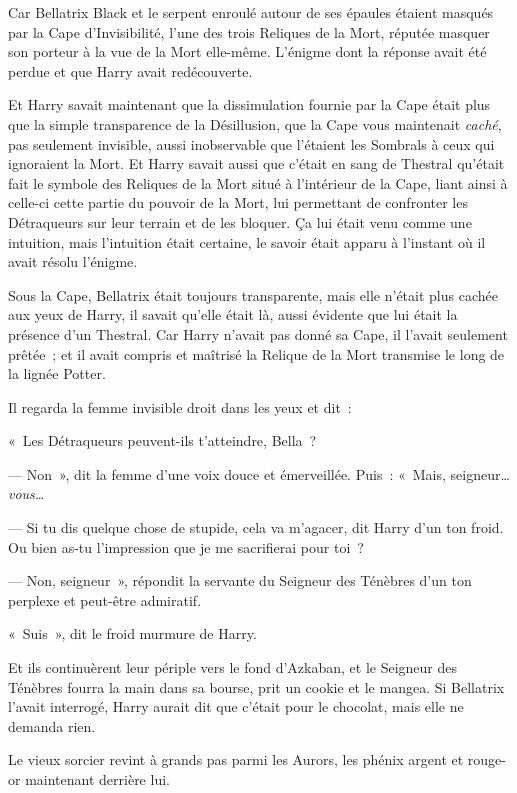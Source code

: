 Car Bellatrix Black et le serpent enroulé autour de ses épaules étaient masqués par la Cape d'Invisibilité, l'une des trois Reliques de la Mort, réputée masquer son porteur à la vue de la Mort elle-même. L'énigme dont la réponse avait été perdue et que Harry avait redécouverte.

Et Harry savait maintenant que la dissimulation fournie par la Cape était plus que la simple transparence de la Désillusion, que la Cape vous maintenait \emph{caché}, pas seulement invisible, aussi inobservable que l'étaient les Sombrals à ceux qui ignoraient la Mort. Et Harry savait aussi que c'était en sang de Thestral qu'était fait le symbole des Reliques de la Mort situé à l'intérieur de la Cape, liant ainsi à celle-ci cette partie du pouvoir de la Mort, lui permettant de confronter les Détraqueurs sur leur terrain et de les bloquer. Ça lui était venu comme une intuition, mais l'intuition était certaine, le savoir était apparu à l'instant où il avait résolu l'énigme.

Sous la Cape, Bellatrix était toujours transparente, mais elle n'était plus cachée aux yeux de Harry, il savait qu'elle était là, aussi évidente que lui était la présence d'un Thestral. Car Harry n'avait pas donné sa Cape, il l'avait seulement prêtée~; et il avait compris et maîtrisé la Relique de la Mort transmise le long de la lignée Potter.

Il regarda la femme invisible droit dans les yeux et dit~:

«~Les Détraqueurs peuvent-ils t'atteindre, Bella~?

--- Non~», dit la femme d'une voix douce et émerveillée. Puis~: «~Mais, seigneur… \emph{vous…}

--- Si tu dis quelque chose de stupide, cela va m'agacer, dit Harry d'un ton froid. Ou bien as-tu l'impression que je me sacrifierai pour toi~?

--- Non, seigneur~», répondit la servante du Seigneur des Ténèbres d'un ton perplexe et peut-être admiratif.

«~Suis~», dit le froid murmure de Harry.

Et ils continuèrent leur périple vers le fond d'Azkaban, et le Seigneur des Ténèbres fourra la main dans sa bourse, prit un cookie et le mangea. Si Bellatrix l'avait interrogé, Harry aurait dit que c'était pour le chocolat, mais elle ne demanda rien.

\later

Le vieux sorcier revint à grands pas parmi les Aurors, les phénix argent et rouge-or maintenant derrière lui.


